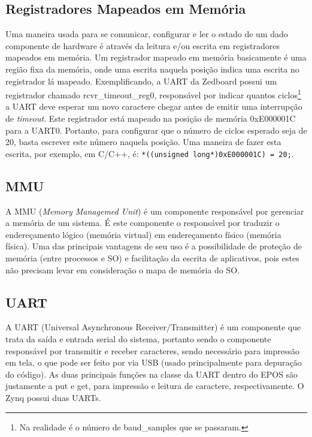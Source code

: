 \subsection{Registradores Mapeados em Memória}
Uma maneira usada para se comunicar, configurar e ler o estado de um dado componente de hardware é através da leitura e/ou escrita em registradores mapeados em memória. Um registrador mapeado em memória basicamente é uma região fixa da memória, onde uma escrita naquela posição indica uma escrita no registrador lá mapeado.
Exemplificando, a UART da Zedboard possui um registrador chamado rcvr\_timeout\_reg0, responsável por indicar quantos ciclos\footnote{Na realidade é o número de baud\_samples que se passaram.} a UART deve esperar um novo caractere chegar antes de emitir uma interrupção de \emph{timeout}. Este registrador está mapeado na posição de memória 0xE000001C para a UART0. Portanto, para configurar que o número de ciclos esperado seja de 20, basta escrever este número naquela posição. Uma maneira de fazer esta escrita, por exemplo, em C/C++, é: \verb+*((unsigned long*)0xE000001C) = 20;+.




\subsection{MMU} %
A MMU (\emph{Memory Managemed Unit}) é um componente responsável por gerenciar a memória de um sistema. É este componente o responsável por traduzir o endereçamento lógico (memória virtual) em endereçamento físico (memória física). Uma das principais vantagens de seu uso é a possibilidade de proteção de memória (entre processos e SO) e facilitação da escrita de aplicativos, pois estes não precisam levar em consideração o mapa de memória do SO.

\subsection{UART}
A UART (Universal Asynchronous Receiver/Transmitter) é um componente que trata da saída e entrada serial do sistema, portanto sendo o componente responsável por transmitir e receber caracteres, sendo necessário para impressão em tela, o que pode ser feito por via USB (usado principalmente para depuração do código). As duas principais funções na classe da UART dentro do EPOS são justamente a put e get, para impressão e leitura de caractere, respectivamente. O Zynq possui duas UARTs.


